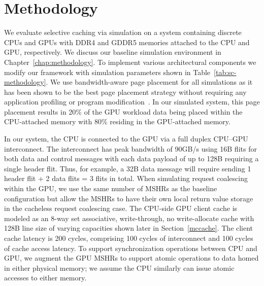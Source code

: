 \vspace{-.05in}
\section{Methodology}
\label{methodology}

We evaluate selective caching via simulation on a system containing discrete CPUs and GPUs with
DDR4 and GDDR5 memories attached to the CPU and GPU, respectively.  We discuss
our baseline simulation environment in Chapter~\ref{chap:methodology}.
To implement various architectural components we modify our framework 
with simulation parameters shown in Table~\ref{tab:sc-methodology}.
We use bandwidth-aware page placement for all simulations as it has been
shown to be the best page placement strategy without requiring
any application profiling or program modification~\cite{Agarwal2015}. 
In our simulated system, this page placement results in 20\% of the
GPU workload data being placed within the CPU-attached memory with 80\% residing in the GPU-attached
memory.  

In our system, the CPU is connected to the GPU via a full duplex CPU--GPU
interconnect. The interconnect has peak bandwidth of 90GB/s using 16B flits for
both data and control messages with each data payload of up to 128B requiring a
single header flit.  Thus, for example, a 32B data message will require sending
1 header flit + 2 data flits = 3 flits in total.
When simulating request coalescing within the GPU, we use the same number of
MSHRs as the baseline configuration but allow the MSHRs to have their own local
return value storage in the cacheless request coalescing case.  The CPU-side GPU
client cache is modeled as an 8-way set associative, write-through, no
write-allocate cache with 128B line size of varying capacities shown later in
Section~\ref{mccache}. The client cache latency is 200 cycles, comprising 100
cycles of interconnect and 100 cycles of cache access latency.  To support
synchronization operations between CPU and GPU, we augment the GPU MSHRs to
support atomic operations to data homed in either physical memory; we assume the
CPU similarly can issue atomic accesses to either memory.

